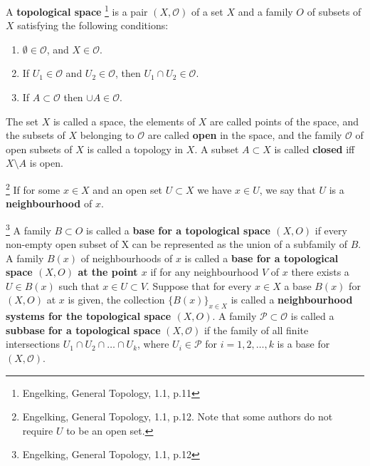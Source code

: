 \begin{definition} \label{D:topo}
A \textbf{topological space}  
\footnote{Engelking, General Topology, 1.1, p.11}
is a pair $(X,\mathcal{O})$ of a set $X$ and a family $O$ of
subsets of $X$ satisfying the following conditions:
\begin{enumerate}
  \item[(O1)] $\emptyset\in \mathcal{O}$, and $X\in \mathcal{O}$.
  \item[(O2)] If $U_1\in \mathcal{O}$ and $U_2\in \mathcal{O}$, then $U_1\cap U_2\in \mathcal{O}$.
  \item[(O3)] If $A\subset \mathcal{O}$ then $\cup A\in \mathcal{O}$.
\end{enumerate}
The set $X$ is called a space, the elements of $X$ are called points of the
space, and the subsets of $X$ belonging to $\mathcal{O}$ are called 
\textbf{open} 
in the space, and the family $\mathcal{O}$ of open subsets of $X$ is 
called a topology in $X$. 
A subset $A\subset X$ is called 
\textbf{closed} 
iff $X\setminus A$ is open.
\end{definition}

\begin{definition} 
\footnote{
  Engelking, General Topology, 1.1, p.12.
  Note that some authors do not require $U$ to be an open set.
}
If for some $x\in X$ and an open set $U\subset X$ we have $x\in U$,
we say that $U$ is a 
\textbf{neighbourhood} 
of $x$.
\end{definition} 


\begin{definition} 
\footnote{Engelking, General Topology, 1.1, p.12}
A family $B\subset O$ is called a \textbf{base for a topological space $(X,O)$}
if every non-empty open subset of X can be represented as the union of a
subfamily of $B$. A family $B(x)$ of neighbourhoods of $x$ is called a 
\textbf{base for a topological space $(X,O)$ at the point $x$}
if for any neighbourhood $V$ of $x$ there exists a $U\in B(x)$ such that 
$x\in U\subset V$. Suppose that for every $x\in X$ a base $B(x)$ for $(X,O)$ at 
$x$ is given, the collection $\{B(x)\}_{x\in X}$ is called a 
\textbf{neighbourhood systems for the topological space $(X,O)$}. 
A family $\mathcal{P}\subset\mathcal{O}$ is called a \textbf{subbase for a
topological space} $(X,\mathcal{O})$ 
if the family of all finite intersections $U_1\cap U_2\cap \dots\cap U_k$, where
$U_i\in\mathcal{P}$ for $i=1,2,\dots,k$ is a base for $(X,\mathcal{O})$.
\end{definition}


